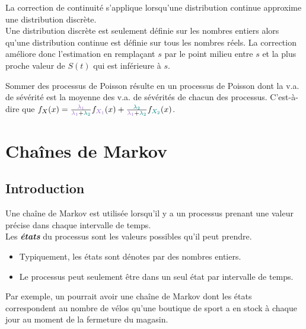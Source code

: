 \documentclass[10pt, french]{article}
\begin{document}
\begin{multicols*}{2}
\begin{definitionNOHFILLpropos}
La correction de continuité s'applique lorsqu'une distribution continue approxime une distribution discrète. \\

Une distribution discrète est seulement définie sur les nombres entiers alors qu'une distribution continue est définie sur tous les nombres réels. La correction améliore donc l'estimation en remplaçant $s$ par le point milieu entre $s$ et la plus proche valeur de $S(t)$ qui est inférieure à $s$.
\end{definitionNOHFILLpropos}

Sommer des processus de Poisson résulte en un processus de Poisson dont la v.a. de sévérité est la moyenne des v.a. de sévérités de chacun des processus. C'est-à-dire que $f_{X}(x) = \frac{\textcolor{amethyst}{\lambda_{1}}}{\textcolor{amethyst}{\lambda_{1}} + \textcolor{teal}{\lambda_{2}}} f_{\textcolor{amethyst}{X_{1}}}(x) + \frac{\textcolor{teal}{\lambda_{2}}}{\textcolor{amethyst}{\lambda_{1}} + \textcolor{teal}{\lambda_{2}}} f_{\textcolor{teal}{X_{2}}}(x)$.



\pagebreak
\section{Chaînes de Markov}
\subsection{Introduction}
\begin{rappel_enhanced}[Contexte]
Une chaîne de Markov est utilisée lorsqu'il y a un processus prenant une valeur précise dans chaque intervalle de temps.\\

Les \textbf{\textit{états}} du processus sont les valeurs possibles qu'il peut prendre.
\begin{itemize}
	\item	Typiquement, les états sont dénotes par des nombres entiers.
	\item	Le processus peut seulement être dans un seul état par intervalle de temps.
\end{itemize}

Par exemple, un pourrait avoir une chaîne de Markov dont les états correspondent au nombre de vélos qu'une boutique de sport a en stock à chaque jour au moment de la fermeture du magasin.	


\end{rappel_enhanced}
\end{multicols*}
\end{document}
